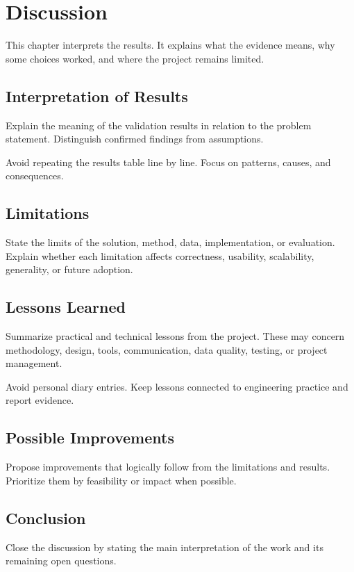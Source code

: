 \chapter{Discussion}
\label{chap:discussion}

This chapter interprets the results. It explains what the evidence means, why some choices worked, and where the project remains limited.

\section{Interpretation of Results}
Explain the meaning of the validation results in relation to the problem statement. Distinguish confirmed findings from assumptions.

Avoid repeating the results table line by line. Focus on patterns, causes, and consequences.

\section{Limitations}
State the limits of the solution, method, data, implementation, or evaluation. Explain whether each limitation affects correctness, usability, scalability, generality, or future adoption.


\section{Lessons Learned}
Summarize practical and technical lessons from the project. These may concern methodology, design, tools, communication, data quality, testing, or project management.

Avoid personal diary entries. Keep lessons connected to engineering practice and report evidence.

\section{Possible Improvements}
Propose improvements that logically follow from the limitations and results. Prioritize them by feasibility or impact when possible.

\section{Conclusion}
Close the discussion by stating the main interpretation of the work and its remaining open questions.